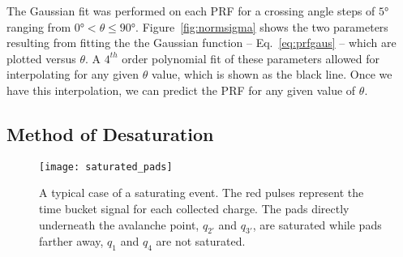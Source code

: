 \begin{comment}
\begin{table}
\centering
 \begin{tabular}{||c c c c c c||} 
 \hline
 Coefficient & $c_0$ & $c_1$ & $c_2$ & $c_3$ & $c_4$ \\ [0.5ex] 
 \hline\hline
 $0 < \theta < 45$ & & & & &  \\ [.25ex]
 \hline
 $N_0$ & .897 & 5.766E-3 & -4.263E-4 & 7.444E-6 & 5.705E-8 \\ 
 \hline
 $\sigma$ & 5.496 & -3.920E-2 & 2.693E-3 & -5.208E-5 & 5.334E-7\\
 \hline
 $45 < \theta < 90$ & & & &  & \\ [.25ex]
 \hline	
 $N_0$ & 1.220 & -6.258E-2 & 1.608E-3 & -1.492E-5  & 4.654E-8 \\
 \hline
 $\sigma$ & 31.368 & -1.109 & 1.779E-2 & -1.336E-4 & 3.940E-7\\
 \hline
\end{tabular}
\caption{Coefficients of the $4_th$ order polynomial fit to the Gaussian parameters $N_0$ and $\sigma$. The polynomial form is given as $c_0 + c_1 x + c_2 x^2 + c_3 x^3 + c_4 x^4$}
\label{tb:coeff}
\end{table}
\end{comment}
 
The Gaussian fit was performed on each PRF for a crossing angle steps of  $\ang{5}$ ranging from $\ang{0} < \theta \leq \ang{90}$. Figure~\ref{fig:normsigma} shows the two parameters resulting from fitting the the Gaussian function -- Eq.~\ref{eq:prfgaus} -- which are plotted versus $\theta$. A $4^{th}$ order polynomial fit of these parameters allowed for interpolating for any given $\theta$ value, which is shown as the black line. Once we have this interpolation, we can predict the PRF for any given value of $\theta$. 


\subsection{Method of Desaturation}
\label{sec:desat}

\begin{figure}[ht!]
\texttt{[image: saturated\_pads]}
\caption{A typical case of a saturating event. The red pulses represent the time bucket signal for each collected charge. The pads directly underneath the avalanche point, $q_{2'}$ and $q_{3'}$, are saturated while pads farther away, $q_1$ and $q_4$ are not saturated.}
\label{fig:satpad}
\end{figure}

